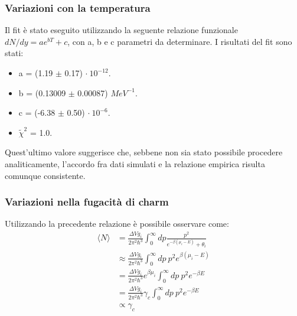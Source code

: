 \documentclass[11pt]{beamer}
\begin{document}
	
	\begin{frame}
		\frametitle{Variazioni con la temperatura}
		
		Il fit è stato eseguito utilizzando la seguente relazione funzionale 
		$dN/dy = a e^{bT} + c$, con a, b e c parametri da determinare. 
		I risultati del fit sono stati:
		
		\begin{itemize}
			\item a = (1.19 $\pm$ 0.17) $\cdot \ 10^{-12}$.
			\item b = (0.13009 $\pm$ 0.00087) $MeV^{-1}$.
			\item c = (-6.38 $\pm$ 0.50) $\cdot \ 10^{-6}$.
			\item $\tilde{\chi}^2$ = 1.0.
		\end{itemize}
		
		Quest'ultimo valore suggerisce che, sebbene non sia stato possibile procedere analiticamente, l'accordo fra dati simulati e la relazione empirica risulta comunque consistente.
		
	\end{frame}
	
	\begin{frame}
		\frametitle{Variazioni nella fugacità di charm}
		Utilizzando la precedente relazione è possibile osservare come:
		\begin{equation}
			\begin{aligned}
				\langle N \rangle &= \frac{\Delta V g_i}{2\pi^2\hbar^3} 
				\int_{0}^{\infty} dp 
				\frac{p^2}{e^{-\beta(\mu_i-E)}+\theta_i} \\
				&\approx \frac{\Delta V g_i}{2\pi^2\hbar^3} 
				\int_{0}^{\infty} dp \ p^2 e^{\beta(\mu_i-E)} \\
				&= \frac{\Delta V g_i}{2\pi^2\hbar^3} e^{\beta \mu_i} 
				\int_{0}^{\infty} dp \ p^2 e^{-\beta E} \\
				&= \frac{\Delta V g_i}{2\pi^2\hbar^3} \gamma_c 
				\int_{0}^{\infty} dp \ p^2 e^{-\beta E}\\
				&\propto \gamma_c
			\end{aligned}
		\end{equation} 
	\end{frame}
	
\end{document}
